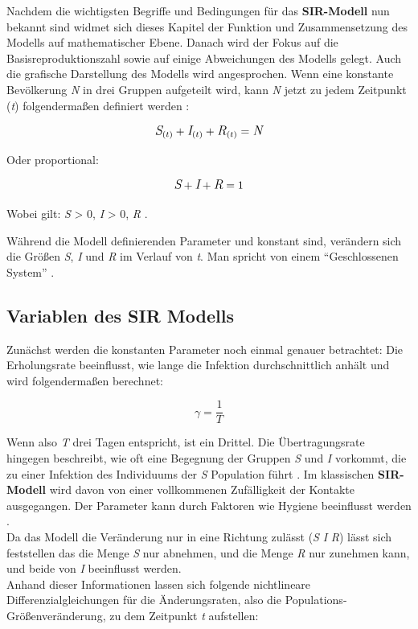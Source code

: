 \documentclass[12pt]{scrartcl} %
\begin{document}
Nachdem die wichtigsten Begriffe und Bedingungen für das \textbf{SIR-Modell} nun bekannt sind widmet sich dieses Kapitel der Funktion und Zusammensetzung des Modells auf mathematischer Ebene. Danach wird der Fokus auf die Basisreproduktionszahl sowie auf einige Abweichungen des Modells gelegt. Auch die grafische Darstellung des Modells wird angesprochen.
Wenn eine konstante Bevölkerung \textit{N} in drei Gruppen aufgeteilt wird, kann \textit{N} jetzt zu jedem Zeitpunkt (\textit{t}) folgendermaßen definiert werden \cite{3,4}:

$$ \large\textit{S}_{(t)} + \textit{I}_{(t)} + \textit{R}_{(t)} = \textit{N}\normalsize $$

Oder proportional:

$$ \large\textit{S} + \textit{I} + \textit{R} = 1 $$
\begin{center}
Wobei gilt: \textit{S} > 0, \textit{I} > 0, \textit{R} .
\end{center}

Während die Modell definierenden Parameter \textbeta\space und \textgamma\space konstant sind, verändern sich die Größen \textit{S}, \textit{I} und \textit{R} im Verlauf von \textit{t}. Man spricht von einem "`Geschlossenen System"' \cite{4}.


\subsection{Variablen des SIR Modells}

Zunächst werden die konstanten Parameter noch einmal genauer betrachtet: Die Erholungsrate \textgamma\space beeinflusst, wie lange die Infektion durchschnittlich anhält und wird folgendermaßen berechnet:

$$ \gamma = \frac{1}{T} $$

Wenn also \textit{T} drei Tagen entspricht, ist \textgamma\space ein Drittel. Die Übertragungsrate \textbeta\space hingegen beschreibt, wie oft eine Begegnung der Gruppen \textit{S} und \textit{I} vorkommt, die zu einer Infektion des Individuums der \textit{S} Population führt \cite{2}. 
Im klassischen \textbf{SIR-Modell} wird davon von einer vollkommenen Zufälligkeit der Kontakte ausgegangen. Der Parameter kann durch Faktoren wie Hygiene beeinflusst werden \cite{2,7}.\\
Da das Modell die Veränderung nur in eine Richtung zulässt (\textit{S} \textrightarrow\space \textit{I} \textrightarrow\space \textit{R}) lässt sich feststellen das die Menge \textit{S} nur abnehmen, und die Menge \textit{R} nur zunehmen kann, und beide von \textit{I} beeinflusst werden.\\
Anhand dieser Informationen lassen sich folgende nichtlineare Differenzialgleichungen für die Änderungsraten, also die Populations-Größenveränderung, zu dem Zeitpunkt \textit{t} aufstellen:
\end{document}
